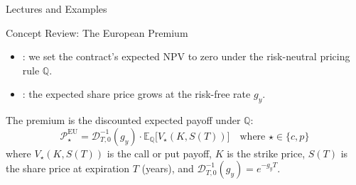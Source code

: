\documentclass[aspectratio=169,11pt]{beamer}
\newcommand{\E}{\mathbb{E}}
\newcommand{\Q}{\mathbb{Q}}
\newcommand{\PEU}{\mathcal{P}^{\text{EU}}}
\newcommand{\Dinv}{\mathcal{D}^{-1}_{T,0}(g_{y})}
\newcommand{\ST}{S(T)}
\newcommand{\repo}{https://github.com/varnerlab/CHEME-5660-CourseRepository-Fall-2026/blob/main/lectures/week-9/L9b}
\newcommand{\repoprev}{https://github.com/varnerlab/CHEME-5660-CourseRepository-Fall-2026/blob/main/lectures/week-9/L9a}
\begin{document}
\begin{frame}{Lectures and Examples}
  \vspace{0.3em}
  {\normalsize\textbf{}\par\small
  \href{\repo/CHEME-5660-L9b-Lecture-American-Derivatives-Intrinsic-Extrinsic-Value-Fall-2026.ipynb}{}}

  \vspace{0.6em}
  {\normalsize\textbf{}\par\small
  \href{\repoprev/CHEME-5660-L9a-Example-BSM-Premium-Fall-2026.ipynb}{}}

  \vspace{0.45em}
  {\normalsize\textbf{}\par\small
  \href{\repo/CHEME-5660-L9b-Example-AmericanContractsPremium-Fall-2026.ipynb}{}}

  \vspace{0.45em}
  {\normalsize\textbf{}\par\small
  \href{\repo/CHEME-5660-L9b-Example-Hull-American-Put-Fall-2026.ipynb}{}}
\end{frame}

\begin{frame}{Concept Review: The European Premium}
  \vspace{0.3em}
  {\large\textbf{}}

  \vspace{0.5em}
  \begin{itemize}\setlength{\itemsep}{0.4em}
    \item {}: we set the contract's expected NPV to zero under
      the risk-neutral pricing rule $\Q$.
    \item \hilite{Under $\Q$}: the expected share price grows at the risk-free
      rate $g_{y}$.
  \end{itemize}

  \vspace{0.5em}
  The premium is the discounted expected payoff under $\Q$:
  \[
    \boxed{\PEU_{\star}=\Dinv\cdot\E_{\Q}\bigl[V_{\star}(K,\ST)\bigr]\quad\text{where }\star\in\{c,p\}}
  \]
  where $V_{\star}(K,\ST)$ is the call or put payoff, $K$ is the strike price,
  $\ST$ is the share price at expiration $T$ (years), and $\Dinv=e^{-g_{y}T}$.
\end{frame}
\end{document}
